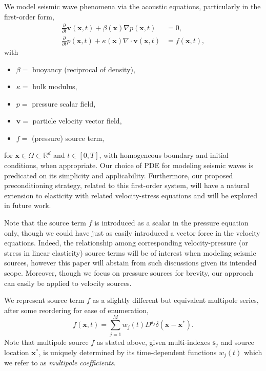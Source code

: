 We model seismic wave phenomena via the acoustic equations, particularly in the first-order form,
\begin{equation}\label{eq:acous1}
\begin{split}
		\frac{\partial}{\partial t} \mathbf v(\mathbf x,t) +  
		\beta(\mathbf x) \nabla p(\mathbf x,t) &= 0, \\
		\frac{\partial}{\partial t} p(\mathbf x,t) + 
		\kappa(\mathbf x)\nabla \cdot \mathbf v (\mathbf x,t) &= f(\mathbf x,t),
\end{split}
\end{equation}
with
\begin{itemize}
	\item $\beta = $ buoyancy (reciprocal of density), 
	\item $\kappa = $ bulk modulus,
	\item $p = $ pressure scalar field, 
	\item $\mathbf v = $ particle velocity vector field,
	\item $f = $ (pressure) source term,
\end{itemize}
for $\mathbf x\in \Omega\subset\mathbb R^d$ and $t\in[0,T]$, with homogeneous boundary and initial conditions, when appropriate.
Our choice of PDE for modeling seismic waves is predicated on its simplicity and applicability. 
Furthermore, our proposed preconditioning strategy, related to this first-order system, will have a natural extension to elasticity with related velocity-stress equations and will be explored in future work.

Note that the source term $f$ is introduced as a scalar in the pressure equation only, though we could have just as easily introduced a vector force in the velocity equations.
Indeed, the relationship among corresponding velocity-pressure (or stress in linear elasticity) source terms will be of interest when modeling seismic sources, however this paper will abstain from such discussions given its intended scope. 
Moreover, though we focus on pressure sources for brevity, our approach can easily be applied to velocity sources.

We represent source term $f$ as a slightly different but equivalent multipole series, after some reordering for ease of enumeration, 
\begin{equation}\label{eq:MPSrep}
	f(\mathbf x,t) = \sum_{j=1}^M w_j(t) D^{\mathbf s_j} \delta(\mathbf x-\mathbf x^*).
\end{equation}
Note that multipole source $f$ as stated above, given multi-indexes $\mathbf s_j$ and source location $\mathbf x^*$, is uniquely determined by its time-dependent functions $w_j(t)$ which we refer to as {\em multipole coefficients}.

